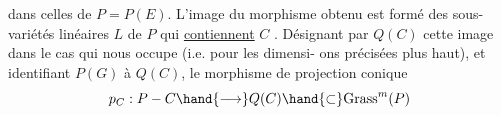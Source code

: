 dans celles de  $P=P(E)$.  L'image du morphisme obtenu est formé des
sous-variétés linéaires  $L$ de $P$ qui \uline{contiennent} $C$ . Désignant
par $Q(C)$ cette image dans le cas qui nous occupe (i.e. pour les dimensi-%
ons précisées plus haut), et identifiant $P(G)$ à $Q(C)$, le morphisme
de projection conique
\[ p_C : P - C \hand{\longrightarrow} Q(C) \hand{\subset} \mathrm{Grass}^m(P) \]

